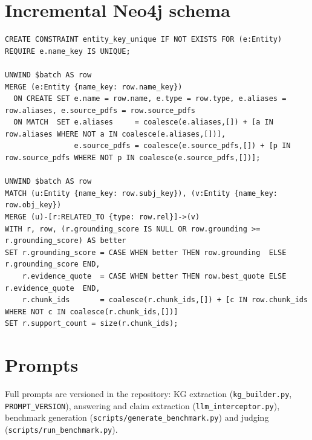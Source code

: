 \documentclass[10pt,twocolumn]{article}
\theoremstyle{remark}
\begin{document}
\section{Incremental Neo4j schema}
\label{app:cypher}
\begin{footnotesize}
\begin{verbatim}
CREATE CONSTRAINT entity_key_unique IF NOT EXISTS FOR (e:Entity) REQUIRE e.name_key IS UNIQUE;

UNWIND $batch AS row
MERGE (e:Entity {name_key: row.name_key})
  ON CREATE SET e.name = row.name, e.type = row.type, e.aliases = row.aliases, e.source_pdfs = row.source_pdfs
  ON MATCH  SET e.aliases     = coalesce(e.aliases,[]) + [a IN row.aliases WHERE NOT a IN coalesce(e.aliases,[])],
                e.source_pdfs = coalesce(e.source_pdfs,[]) + [p IN row.source_pdfs WHERE NOT p IN coalesce(e.source_pdfs,[])];

UNWIND $batch AS row
MATCH (u:Entity {name_key: row.subj_key}), (v:Entity {name_key: row.obj_key})
MERGE (u)-[r:RELATED_TO {type: row.rel}]->(v)
WITH r, row, (r.grounding_score IS NULL OR row.grounding >= r.grounding_score) AS better
SET r.grounding_score = CASE WHEN better THEN row.grounding  ELSE r.grounding_score END,
    r.evidence_quote  = CASE WHEN better THEN row.best_quote ELSE r.evidence_quote  END,
    r.chunk_ids       = coalesce(r.chunk_ids,[]) + [c IN row.chunk_ids WHERE NOT c IN coalesce(r.chunk_ids,[])]
SET r.support_count = size(r.chunk_ids);
\end{verbatim}
\end{footnotesize}

\section{Prompts}
\label{app:prompts}
Full prompts are versioned in the repository: KG extraction (\texttt{kg\_builder.py}, \texttt{PROMPT\_VERSION}),
answering and claim extraction (\texttt{llm\_interceptor.py}), benchmark generation
(\texttt{scripts/generate\_benchmark.py}) and judging (\texttt{scripts/run\_benchmark.py}).
\end{document}
